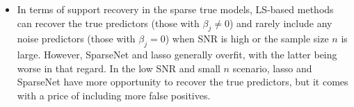 \begin{itemize}
	\item In terms of support recovery in the sparse true models, LS-based methods can recover the true predictors (those with $\beta_j \ne 0$) and rarely include any noise predictors (those with $\beta_j = 0$) when SNR is high or the sample size $n$ is large. However, SparseNet and lasso generally overfit, with the latter being worse in that regard. In the low SNR and small $n$ scenario, lasso and SparseNet have more opportunity to recover the true predictors, but it comes with a price of including more false positives. 

\end{itemize}



